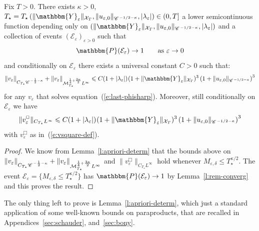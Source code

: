 \begin{lemma}
  \label{l:apriori-bounds}
  
  Fix $T > 0$. There exists $\kappa > 0$, $T_{\star} = T_{\star} \left( \|
  \mathbbm{Y}_{\varepsilon} \|_{\mathcal{X}_T}, \| u_{\varepsilon, 0}
  \|_{\CC^{- 1 / 2 - \kappa}}, | \lambda_{\varepsilon} | \right) \in (0, T]$ a
  lower semicontinuous function depending only on $\left( \|
  \mathbbm{Y}_{\varepsilon} \|_{\mathcal{X}_T}, \| u_{\varepsilon, 0}
  \|_{\CC^{- 1 / 2 - \kappa}}, | \lambda_{\varepsilon} | \right)$ and a
  collection of events $(\mathcal{E}_{\varepsilon})_{\varepsilon > 0}$ such
  that
  \[ \mathbbm{P} (\mathcal{E}_{\varepsilon}) \rightarrow 1 \qquad \text{as
     $\varepsilon \rightarrow 0$} \]
  and conditionally on $\mathcal{E}_{\varepsilon}$ there exists a universal
  constant $C > 0$ such that:
  \[ \| v_{\varepsilon} \|_{C_{T_{\star}} \CC^{- \frac{1}{2} - \kappa}} + \|
     v_{\varepsilon} \|_{\mathcal{M}_{T_{\star}}^{\frac{1}{4} + \frac{3
     \kappa}{2}} L^{\infty}} \leqslant C (1 + | \lambda_{\varepsilon} |)_{} 
     (1 + \| \mathbbm{Y}_{\varepsilon} \|_{\mathcal{X}_T})^3 \left( 1 + \|
     u_{\varepsilon, 0} \|_{\CC^{- 1 / 2 - \kappa}} \right)^3 \]
  for any $v_{\varepsilon}$ that solves equation~(\ref{e:last-phisharp}).
  Moreover, still conditionally on $\mathcal{E}_{\varepsilon}$ we have
  \[ \| v_{\varepsilon}^{\Box} \|_{C_{T_{\star}} L^{\infty}} \leqslant C (1 +
     | \lambda_{\varepsilon} |)_{}  (1 + \| \mathbbm{Y}_{\varepsilon}
     \|_{\mathcal{X}_T})^3 \left( 1 + \| u_{\varepsilon, 0} \|_{\CC^{- 1 / 2 -
     \kappa}} \right)^3 \]
  with $v_{\varepsilon}^{\Box}$ as in~(\ref{e:vsquare-def}).
\end{lemma}

\begin{proof}
  We know from Lemma~\ref{l:apriori-determ} that the bounds above on $\|
  v_{\varepsilon} \|_{C_{T_{\star}} \mathscr{C} \hspace{.1em}^{- \frac{1}{2} - \kappa}} + \|
  v_{\varepsilon} \|_{\mathcal{M}_{T_{\star}}^{\frac{1}{4} + \frac{3
  \kappa}{2}} L^{\infty}}$ and $\| v_{\varepsilon}^{\Box} \|_{C_{T_{\star}}
  L^{\infty}}$ hold whenever $M_{\varepsilon, \delta} \leqslant
  T_{\star}^{\kappa / 2}$. The event $\mathcal{E}_{\varepsilon} = \{
  M_{\varepsilon, \delta} \leqslant T_{\star}^{\kappa / 2} \}$ has
  $\mathbbm{P} (\mathcal{E}_{\varepsilon}) \rightarrow 1$ by
  Lemma~\ref{l:rem-converg} and this proves the result.
\end{proof}

The only thing left to prove is Lemma~\ref{l:apriori-determ}, which just a
standard application of some well-known bounds on paraproducts, that are
recalled in Appendices~\ref{sec:schauder}, and~\ref{sec:bony}.

